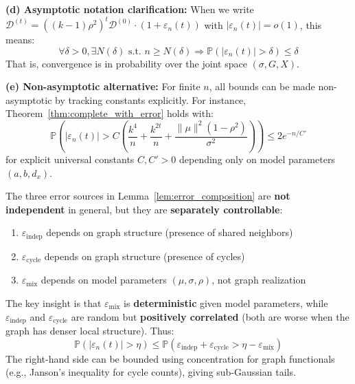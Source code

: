 \begin{remark}
\textbf{(d) Asymptotic notation clarification:}
When we write $\mathcal{D}^{(t)} = ((k-1)\rho^2)^t \mathcal{D}^{(0)} \cdot (1 + \varepsilon_n(t))$ with $|\varepsilon_n(t)| = o(1)$, this means:
\begin{equation}
    \forall \delta > 0, \exists N(\delta) \text{ s.t. } n \geq N(\delta) \Rightarrow \mathbb{P}(|\varepsilon_n(t)| > \delta) \leq \delta
\end{equation}
That is, convergence is in probability over the joint space $(\sigma, G, X)$.

\textbf{(e) Non-asymptotic alternative:}
For finite $n$, all bounds can be made non-asymptotic by tracking constants explicitly. For instance, Theorem~\ref{thm:complete_with_error} holds with:
\begin{equation}
    \mathbb{P}\left(|\varepsilon_n(t)| > C\left(\frac{k^4}{n} + \frac{k^{2t}}{n} + \frac{\|\mu\|^2(1-\rho^2)}{\sigma^2}\right)\right) \leq 2e^{-n/C'}
\end{equation}
for explicit universal constants $C, C' > 0$ depending only on model parameters $(a, b, d_x)$.
\end{remark}

\begin{remark}
\label{rem:error_independence}
The three error sources in Lemma~\ref{lem:error_composition} are \textbf{not independent} in general, but they are \textbf{separately controllable}:
\begin{enumerate}
    \item $\varepsilon_{\mathrm{indep}}$ depends on graph structure (presence of shared neighbors)
    \item $\varepsilon_{\mathrm{cycle}}$ depends on graph structure (presence of cycles)
    \item $\varepsilon_{\mathrm{mix}}$ depends on model parameters $(\mu, \sigma, \rho)$, not graph realization
\end{enumerate}

The key insight is that $\varepsilon_{\mathrm{mix}}$ is \textbf{deterministic} given model parameters, while $\varepsilon_{\mathrm{indep}}$ and $\varepsilon_{\mathrm{cycle}}$ are random but \textbf{positively correlated} (both are worse when the graph has denser local structure). Thus:
\begin{equation}
    \mathbb{P}(|\varepsilon_n(t)| > \eta) \leq \mathbb{P}(\varepsilon_{\mathrm{indep}} + \varepsilon_{\mathrm{cycle}} > \eta - \varepsilon_{\mathrm{mix}})
\end{equation}
The right-hand side can be bounded using concentration for graph functionals (e.g., Janson's inequality for cycle counts), giving sub-Gaussian tails.
\end{remark}

